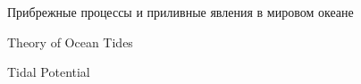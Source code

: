 \begin{chapter}{Прибрежные процессы и приливные явления в мировом океане}
\begin{section}{Theory of Ocean Tides}
\begin{paragraph}{Tidal Potential}


\end{paragraph}
\end{section}
\end{chapter}
